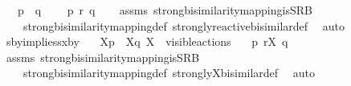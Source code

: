 \begin{isabellebody}
\ \ \ {\isacartoucheopen}{\isasymtheta}{\isacharparenleft}{\kern0pt}p{\isacharparenright}{\kern0pt}\ {\isasymleftrightarrow}\ {\isasymtheta}{\isacharparenleft}{\kern0pt}q{\isacharparenright}{\kern0pt}{\isacartoucheclose}\ \isanewline
\ \ \ {\isacartoucheopen}p\ {\isasymleftrightarrow}\isactrlsub r\ q{\isacartoucheclose}\isanewline
%
\isadelimproof
\ \ %
\endisadelimproof
%
\isatagproof
{}\isamarkupfalse%
\ assms\ strong{\isacharunderscore}{\kern0pt}bisimilarity{\isacharunderscore}{\kern0pt}mapping{\isacharunderscore}{\kern0pt}is{\isacharunderscore}{\kern0pt}SRB\isanewline
\ \ \ \ strong{\isacharunderscore}{\kern0pt}bisimilarity{\isacharunderscore}{\kern0pt}mapping{\isacharunderscore}{\kern0pt}def\ strongly{\isacharunderscore}{\kern0pt}reactive{\isacharunderscore}{\kern0pt}bisimilar{\isacharunderscore}{\kern0pt}def\ \isamarkupfalse%
\ auto%
\endisatagproof
{\isafoldproof}%
%
\isadelimproof
\isanewline
%
\endisadelimproof
{}\isamarkupfalse%
\ sby{\isacharunderscore}{\kern0pt}implies{\isacharunderscore}{\kern0pt}sxby{\isacharcolon}{\kern0pt}\isanewline
\ \ \ {\isacartoucheopen}{\isasymtheta}{\isacharbrackleft}{\kern0pt}X{\isacharbrackright}{\kern0pt}{\isacharparenleft}{\kern0pt}p{\isacharparenright}{\kern0pt}\ {\isasymleftrightarrow}\ {\isasymtheta}{\isacharbrackleft}{\kern0pt}X{\isacharbrackright}{\kern0pt}{\isacharparenleft}{\kern0pt}q{\isacharparenright}{\kern0pt}{\isacartoucheclose}\ {\isacartoucheopen}X\ {\isasymsubseteq}\ visible{\isacharunderscore}{\kern0pt}actions{\isacartoucheclose}\isanewline
\ \ \ {\isacartoucheopen}p\ {\isasymleftrightarrow}\isactrlsub r\isactrlsup X\ q{\isacartoucheclose}\ \isanewline
%
\isadelimproof
\ \ %
\endisadelimproof
%
\isatagproof
{}\isamarkupfalse%
\ assms\ strong{\isacharunderscore}{\kern0pt}bisimilarity{\isacharunderscore}{\kern0pt}mapping{\isacharunderscore}{\kern0pt}is{\isacharunderscore}{\kern0pt}SRB\isanewline
\ \ \ \ strong{\isacharunderscore}{\kern0pt}bisimilarity{\isacharunderscore}{\kern0pt}mapping{\isacharunderscore}{\kern0pt}def\ strongly{\isacharunderscore}{\kern0pt}X{\isacharunderscore}{\kern0pt}bisimilar{\isacharunderscore}{\kern0pt}def\ \isamarkupfalse%
\ auto%
\endisatagproof
{\isafoldproof}%
%
\isadelimproof
%
\endisadelimproof
%
\begin{isamarkuptext}%

\end{isamarkuptext}
\end{isabellebody}
